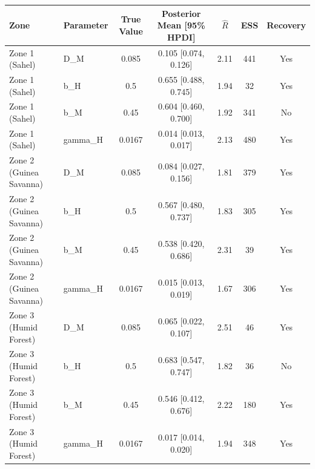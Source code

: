 \begin{tabular}{llccccc}
\hline
Zone & Parameter & True Value & Posterior Mean [95\% HPDI] & $\hat{R}$ & ESS & Recovery \\
\hline
Zone 1 (Sahel) & D_M & 0.085 & 0.105 [0.074, 0.126] & 2.11 & 441 & Yes \\
Zone 1 (Sahel) & b_H & 0.5 & 0.655 [0.488, 0.745] & 1.94 & 32 & Yes \\
Zone 1 (Sahel) & b_M & 0.45 & 0.604 [0.460, 0.700] & 1.92 & 341 & No \\
Zone 1 (Sahel) & gamma_H & 0.0167 & 0.014 [0.013, 0.017] & 2.13 & 480 & Yes \\
Zone 2 (Guinea Savanna) & D_M & 0.085 & 0.084 [0.027, 0.156] & 1.81 & 379 & Yes \\
Zone 2 (Guinea Savanna) & b_H & 0.5 & 0.567 [0.480, 0.737] & 1.83 & 305 & Yes \\
Zone 2 (Guinea Savanna) & b_M & 0.45 & 0.538 [0.420, 0.686] & 2.31 & 39 & Yes \\
Zone 2 (Guinea Savanna) & gamma_H & 0.0167 & 0.015 [0.013, 0.019] & 1.67 & 306 & Yes \\
Zone 3 (Humid Forest) & D_M & 0.085 & 0.065 [0.022, 0.107] & 2.51 & 46 & Yes \\
Zone 3 (Humid Forest) & b_H & 0.5 & 0.683 [0.547, 0.747] & 1.82 & 36 & No \\
Zone 3 (Humid Forest) & b_M & 0.45 & 0.546 [0.412, 0.676] & 2.22 & 180 & Yes \\
Zone 3 (Humid Forest) & gamma_H & 0.0167 & 0.017 [0.014, 0.020] & 1.94 & 348 & Yes \\
\hline
\end{tabular}
